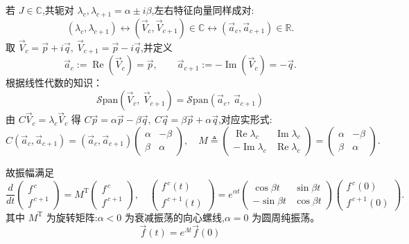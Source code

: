 \documentclass[11pt,a4paper]{article}
\newcommand{\R}{\mathbb{R}}
\newcommand{\C}{\mathbb{C}}
\newcommand{\diff}[2]{\dfrac{d #1}{d #2}}
\DeclareMathOperator{\Real}{Re}
\DeclareMathOperator{\Imag}{Im}
\begin{document}
若 $J\in\C$,共轭对 $\lambda_c,\lambda_{c+1}=\alpha\pm i\beta$,左右特征向量同样成对:
\begin{equation}
(\lambda_c,\lambda_{c+1})\leftrightarrow(\vec V_c,\vec V_{c+1})\in\C
\leftrightarrow(\vec a_c,\vec a_{c+1})\in\R.
\end{equation}
取 $\vec V_c=\vec p+i\vec q,\ \vec V_{c+1}=\vec p-i\vec q$,并定义
\[
\vec a_c:=\Real(\vec V_c)=\vec p,\qquad \vec a_{c+1}:=-\Imag(\vec V_c)=-\vec q.
\]
根据线性代数的知识：
\[
\mathcal{S}\mathrm{pan}(\vec V_c,\ \vec V_{c+1})=\mathcal{S}\mathrm{pan}(\vec a_c,\ \vec a_{c+1})
\]
由 $C\vec V_c=\lambda_c\vec V_c$ 得 $C\vec p=\alpha\vec p-\beta\vec q,\ C\vec q=\beta\vec p+\alpha\vec q$,对应实形式:
\begin{equation}
C(\vec a_c,\vec a_{c+1})=(\vec a_c,\vec a_{c+1})
\begin{pmatrix}\alpha & -\beta\\ \beta & \alpha\end{pmatrix},
\quad
M\triangleq
\begin{pmatrix}\Real\lambda_c & \Imag\lambda_c\\ -\Imag\lambda_c & \Real\lambda_c\end{pmatrix}
=\begin{pmatrix}\alpha & -\beta\\ \beta & \alpha\end{pmatrix}.
\end{equation}

故振幅满足
\begin{equation}
\diff{}{t}\begin{pmatrix}f^{\,c}\\ f^{\,c+1}\end{pmatrix}
=M^{\mathrm T}\begin{pmatrix}f^{\,c}\\ f^{\,c+1}\end{pmatrix},\quad
\begin{pmatrix}f^{\,c}(t)\\ f^{\,c+1}(t)\end{pmatrix}
=e^{\alpha t}
\begin{pmatrix}\cos\beta t & \sin\beta t\\ -\sin\beta t & \cos\beta t\end{pmatrix}
\begin{pmatrix}f^{\,c}(0)\\ f^{\,c+1}(0)\end{pmatrix}.
\end{equation}
其中 $M^{\mathrm T}$ 为旋转矩阵:$\alpha<0$ 为衰减振荡的向心螺线,$\alpha=0$ 为圆周纯振荡。
\begin{equation}
	\vec f(t)=e^{\Lambda t}\vec f(0)
	\label{矩阵振幅方程}
\end{equation}
\end{document}
